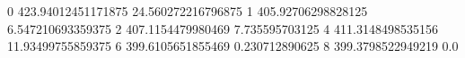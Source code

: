 0 423.94012451171875 24.560272216796875
1 405.92706298828125 6.547210693359375
2 407.1154479980469 7.735595703125
4 411.3148498535156 11.93499755859375
6 399.6105651855469 0.230712890625
8 399.3798522949219 0.0
